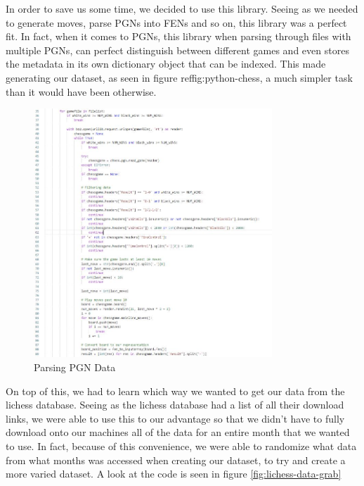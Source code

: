 \documentclass[12pt]{article}
\begin{document}
    In order to save us some time, we decided to use this library. Seeing as we needed to generate moves, parse PGNs into FENs and so on, this library was a perfect fit. In fact, when it comes to PGNs, this library when parsing through files with multiple PGNs, can perfect distinguish between different games and even stores the metadata in its own dictionary object that can be indexed. This made generating our dataset, as seen in figure ref{fig:python-chess}, a much simpler task than it would have been otherwise.

    \begin{singlespace}
        \begin{figure}[ht]
            \centering
            \caption{Parsing PGN Data}
            \label{fig:python-chess}
            \includegraphics[width=0.8\textwidth]{python-chess1.jpg}
        \end{figure}
    \end{singlespace}

    On top of this, we had to learn which way we wanted to get our data from the lichess database. Seeing as the lichess database had a list of all their download links, we were able to use this to our advantage so that we didn't have to fully download onto our machines all of the data for an entire month that we wanted to use. In fact, because of this convenience, we were able to randomize what data from what months was accessed when creating our dataset, to try and create a more varied dataset. A look at the code is seen in figure \ref{fig:lichess-data-grab}
\end{document}
